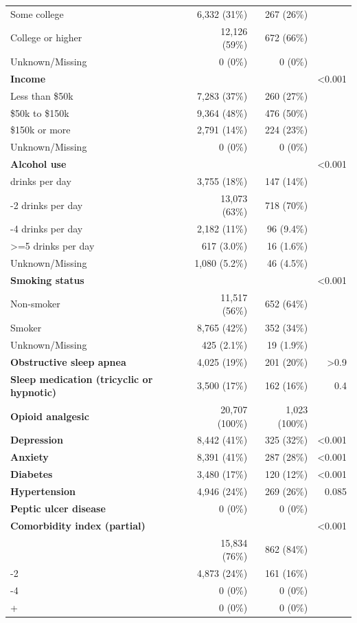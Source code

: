 \documentclass[11pt]{article}
\begin{document}
\begin{longtable}{@{}p{6.4cm}rrr@{}}
\quad Some college & 6,332 (31\%) & 267 (26\%) &  \\
\quad College or higher & 12,126 (59\%) & 672 (66\%) &  \\
\quad Unknown/Missing & 0 (0\%) & 0 (0\%) &  \\
\textbf{Income} &  &  & <0.001 \\
\quad Less than \$50k & 7,283 (37\%) & 260 (27\%) &  \\
\quad \$50k to \$150k & 9,364 (48\%) & 476 (50\%) &  \\
\quad \$150k or more & 2,791 (14\%) & 224 (23\%) &  \\
\quad Unknown/Missing & 0 (0\%) & 0 (0\%) &  \\
\textbf{Alcohol use} &  &  & <0.001 \\
\quad 0 drinks per day & 3,755 (18\%) & 147 (14\%) &  \\
\quad 1-2 drinks per day & 13,073 (63\%) & 718 (70\%) &  \\
\quad 3-4 drinks per day & 2,182 (11\%) & 96 (9.4\%) &  \\
\quad >=5 drinks per day & 617 (3.0\%) & 16 (1.6\%) &  \\
\quad Unknown/Missing & 1,080 (5.2\%) & 46 (4.5\%) &  \\
\textbf{Smoking status} &  &  & <0.001 \\
\quad Non-smoker & 11,517 (56\%) & 652 (64\%) &  \\
\quad Smoker & 8,765 (42\%) & 352 (34\%) &  \\
\quad Unknown/Missing & 425 (2.1\%) & 19 (1.9\%) &  \\
\textbf{Obstructive sleep apnea} & 4,025 (19\%) & 201 (20\%) & >0.9 \\
\textbf{Sleep medication (tricyclic or hypnotic)} & 3,500 (17\%) & 162 (16\%) & 0.4 \\
\textbf{Opioid analgesic} & 20,707 (100\%) & 1,023 (100\%) &  \\
\textbf{Depression} & 8,442 (41\%) & 325 (32\%) & <0.001 \\
\textbf{Anxiety} & 8,391 (41\%) & 287 (28\%) & <0.001 \\
\textbf{Diabetes} & 3,480 (17\%) & 120 (12\%) & <0.001 \\
\textbf{Hypertension} & 4,946 (24\%) & 269 (26\%) & 0.085 \\
\textbf{Peptic ulcer disease} & 0 (0\%) & 0 (0\%) &  \\
\textbf{Comorbidity index (partial)} &  &  & <0.001 \\
\quad 0 & 15,834 (76\%) & 862 (84\%) &  \\
\quad 1-2 & 4,873 (24\%) & 161 (16\%) &  \\
\quad 3-4 & 0 (0\%) & 0 (0\%) &  \\
\quad 5+ & 0 (0\%) & 0 (0\%) &  \\
\bottomrule \end{longtable}\normalsize
\end{document}
